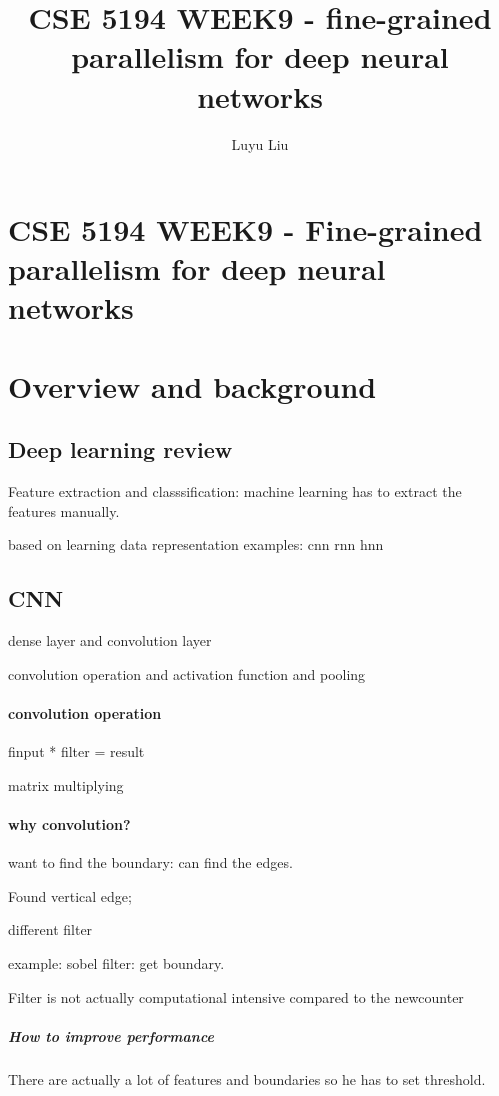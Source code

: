 \documentclass[12pt]{article}
\begin{document}
\author{Luyu Liu}

\newcommand\para{\par\refstepcounter{para}\thepara\space}

\section*{CSE 5194 WEEK9 - Fine-grained parallelism for deep neural networks}
\title{CSE 5194 WEEK9 - fine-grained parallelism for deep neural networks}

\section{Overview and background}
\subsection{Deep learning review} 
Feature extraction and classsification: machine learning has to extract the features manually.

based on learning data representation
examples: cnn rnn hnn

\subsection{CNN}

dense layer and convolution layer

convolution operation and activation function and pooling

\paragraph{convolution operation} finput * filter = result

matrix multiplying

\paragraph{why convolution?} want to find the boundary: can find the edges.

Found vertical edge;

different filter

example: sobel filter: get boundary.

Filter is not actually computational intensive compared to the newcounter

\subparagraph{How to improve performance }
 There are actually a lot of features and boundaries so he has to set threshold.
\end{document}
